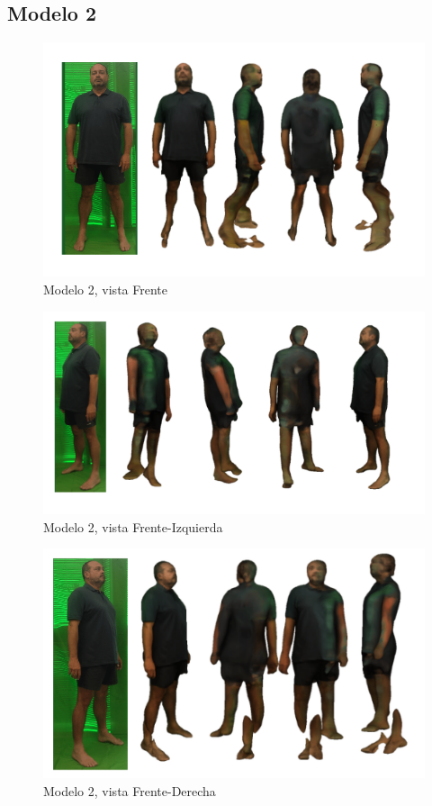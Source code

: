 \subsection{Modelo 2}
\begin{figure}[H]
	\centering
	\includegraphics[scale=0.65]{imagenes/andres1.png}
	\caption{Modelo 2, vista Frente}
	\label{fig:a1}
\end{figure}
\begin{figure}[H]
	\centering
	\includegraphics[scale=0.65]{imagenes/andres2.png}
	\caption{Modelo 2, vista Frente-Izquierda}
	\label{fig:a2}
\end{figure}
\begin{figure}[H]
	\centering
	\includegraphics[scale=0.65]{imagenes/andres3.png}
	\caption{Modelo 2, vista Frente-Derecha}
	\label{fig:a3}
\end{figure}
